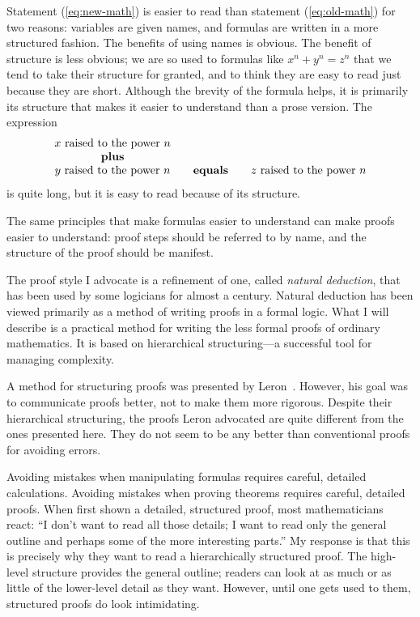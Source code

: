 Statement (\ref{eq:new-math}) is easier to read than statement
(\ref{eq:old-math}) for two reasons: variables are given names, and
formulas are written in a more structured fashion.  The benefits of
using names is obvious.  The benefit of structure is less obvious; we
are so used to formulas like $x^{n}+y^{n}=z^{n}$ that we tend to take
their structure for granted, and to think they are easy to read just
because they are short.  Although the brevity of the formula helps, it
is primarily its structure that makes it easier to understand than
a prose version.  The expression
 \[ \begin{tabular}[b]{@{}c@{}}
      $x$ raised to the power $n$ \\
         {\bf plus}  \\ 
      $y$ raised to the power $n$ 
    \end{tabular}
    \hspace*{2em} {\bf equals} \hspace*{2em}
         \mbox{$z$ raised to the power $n$}
    \]
is quite long, but it is easy to read because of its structure.

The same principles that make formulas easier to understand can make
proofs easier to understand: proof steps should be referred to by name,
and the structure of the proof should be manifest.

The proof style I advocate is a refinement of one, 
called {\em natural deduction}, that has been used by
some logicians for almost a century.
Natural deduction has been viewed primarily as a method of
writing proofs in a formal logic.  What I will describe is a practical
method for writing the less formal proofs of ordinary mathematics.  It
is based on hierarchical structuring---a successful tool for managing
complexity.

A method for structuring proofs was presented by
Leron~\cite{leron:structuring}.  However, his goal was to communicate
proofs better, not to make them more rigorous.  Despite their
hierarchical structuring, the proofs Leron advocated are quite
different from the ones presented here.  They do not seem to be any
better than conventional proofs for avoiding errors.

Avoiding mistakes when manipulating formulas requires careful, detailed
calculations.  Avoiding mistakes when proving theorems requires
careful, detailed proofs.  When first shown a detailed, structured
proof, most mathematicians react: ``I don't want to read all those
details; I want to read only the general outline and perhaps some of
the more interesting parts.'' My response is that this is precisely why
they want to read a hierarchically structured proof.  The high-level
structure provides the general outline; readers can look at as much or
as little of the lower-level detail as they want.  However, until one
gets used to them, structured proofs do look intimidating.

